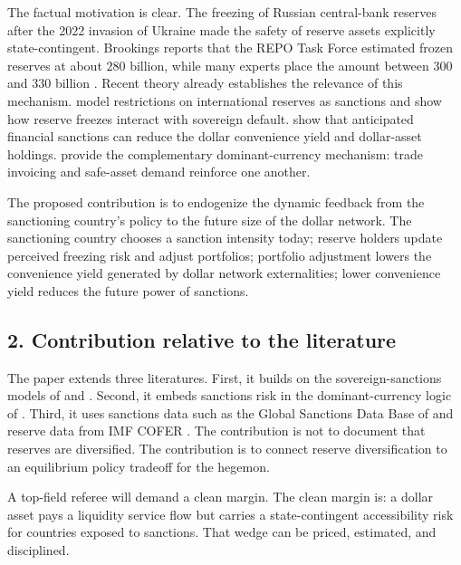 \documentclass[11pt]{article}
\begin{document}
The factual motivation is clear. The freezing of Russian central-bank reserves after the 2022 invasion of Ukraine made the safety of reserve assets explicitly state-contingent. Brookings reports that the REPO Task Force estimated frozen reserves at about $280$ billion, while many experts place the amount between $300$ and $330$ billion \citep{BrookingsRussiaAssets2025}. Recent theory already establishes the relevance of this mechanism. \citet{BianchiSosaPadilla2024JME} model restrictions on international reserves as sanctions and show how reserve freezes interact with sovereign default. \citet{BianchiSosaPadilla2025EJ} show that anticipated financial sanctions can reduce the dollar convenience yield and dollar-asset holdings. \citet{GopinathStein2021} provide the complementary dominant-currency mechanism: trade invoicing and safe-asset demand reinforce one another.

The proposed contribution is to endogenize the dynamic feedback from the sanctioning country's policy to the future size of the dollar network. The sanctioning country chooses a sanction intensity today; reserve holders update perceived freezing risk and adjust portfolios; portfolio adjustment lowers the convenience yield generated by dollar network externalities; lower convenience yield reduces the future power of sanctions.

\subsection*{2. Contribution relative to the literature}
The paper extends three literatures. First, it builds on the sovereign-sanctions models of \citet{BianchiSosaPadilla2024JME} and \citet{BianchiSosaPadilla2025EJ}. Second, it embeds sanctions risk in the dominant-currency logic of \citet{GopinathStein2021}. Third, it uses sanctions data such as the Global Sanctions Data Base of \citet{FelbermayrEtAl2020} and reserve data from IMF COFER \citep{IMFCOFER}. The contribution is not to document that reserves are diversified. The contribution is to connect reserve diversification to an equilibrium policy tradeoff for the hegemon.

A top-field referee will demand a clean margin. The clean margin is: a dollar asset pays a liquidity service flow but carries a state-contingent accessibility risk for countries exposed to sanctions. That wedge can be priced, estimated, and disciplined.
\end{document}

